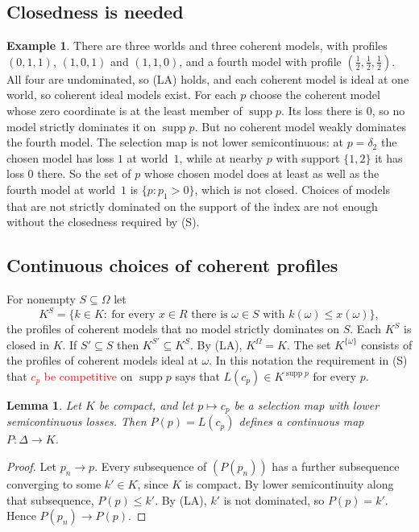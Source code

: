 \documentclass[11pt]{article}
\newtheorem{lemma}[theorem]{Lemma}
\theoremstyle{definition}
\newtheorem{example}[theorem]{Example}
\theoremstyle{remark}
\newcommand{\supp}{\operatorname{supp}}
\begin{document}
\subsection{Closedness is needed}
\begin{example}\label{ex:continuity-needed}
There are three worlds and three coherent models, with profiles $(0,1,1)$, $(1,0,1)$ and $(1,1,0)$, and a fourth model with profile $(\tfrac12,\tfrac12,\tfrac12)$. All four are undominated, so (LA) holds, and each coherent model is ideal at one world, so coherent ideal models exist. For each $p$ choose the coherent model whose zero coordinate is at the least member of $\supp p$. Its loss there is $0$, so no model strictly dominates it on $\supp p$. But no coherent model weakly dominates the fourth model. The selection map is not lower semicontinuous: at $p=\delta_2$ the chosen model has loss $1$ at world~$1$, while at nearby $p$ with support $\{1,2\}$ it has loss $0$ there. So the set of $p$ whose chosen model does at least as well as the fourth model at world~$1$ is $\{p:p_1>0\}$, which is not closed. Choices of models that are not strictly dominated on the support of the index are not enough without the closedness required by (S).
\end{example}

\subsection{Continuous choices of coherent profiles}\label{sec:connect}
For nonempty $S\subseteq\Omega$ let
\[
 K^S=\{k\in K:\ \text{for every }x\in R\text{ there is }\omega\in S\text{ with }k(\omega)\le x(\omega)\},
\]
the profiles of coherent models that no model strictly dominates on $S$. Each $K^S$ is closed in $K$. If $S'\subseteq S$ then $K^{S'}\subseteq K^S$. By (LA), $K^\Omega=K$. The set $K^{\{\omega\}}$ consists of the profiles of coherent models ideal at $\omega$. In this notation the requirement in (S) that \textcolor{red}{$c_p$ be competitive} on $\supp p$ says that $L(c_p)\in K^{\supp p}$ for every $p$.

\begin{lemma}\label{lem:profcont}
Let $K$ be compact, and let $p\mapsto c_p$ be a selection map with lower semicontinuous losses. Then $P(p)=L(c_p)$ defines a continuous map $P:\Delta\to K$.
\end{lemma}
\begin{proof}
Let $p_n\to p$. Every subsequence of $(P(p_n))$ has a further subsequence converging to some $k'\in K$, since $K$ is compact. By lower semicontinuity along that subsequence, $P(p)\le k'$. By (LA), $k'$ is not dominated, so $P(p)=k'$. Hence $P(p_n)\to P(p)$.
\end{proof}
\end{document}
